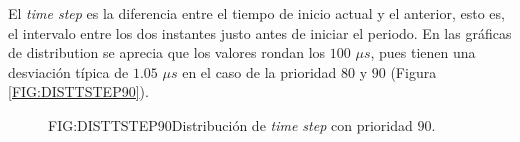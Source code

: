 
El \textit{time step} es la diferencia entre el tiempo de inicio actual y el anterior, esto es, el intervalo entre los dos instantes justo antes de iniciar el periodo. En las gráficas de distribution se aprecia que los valores rondan los $100$ $\mu s$, pues tienen una desviación típica de $1.05$ $\mu s$ en el caso de la prioridad $80$ y $90$ (Figura \ref{FIG:DISTTSTEP90}).

\begin{figure}[Distribución de time step con prioridad 90]{FIG:DISTTSTEP90}{Distribución de \textit{time step} con prioridad $90$.}
\end{figure}
